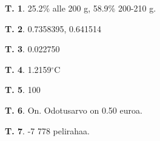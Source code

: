 \documentclass[12pt,leqno,a4paper,oneside]{amsart}
\theoremstyle{definition}
\newtheorem{exercise}{T.}
\theoremstyle{remark}
\numberwithin{equation}{section}
\begin{document}
\begin{exercise}
 25.2\% alle 200 g, 58.9\% 200-210 g.
\end{exercise}

\begin{exercise}
 0.7358395, 0.641514
\end{exercise}

\begin{exercise}
 0.022750
\end{exercise}

\begin{exercise}
 1.2159$^{\circ}$C
\end{exercise}


\begin{exercise}
 100
\end{exercise}

\begin{exercise}
On. Odotusarvo on 0.50 euroa.
\end{exercise}

\begin{exercise}
 -7 778 pelirahaa.
\end{exercise}
\end{document}
